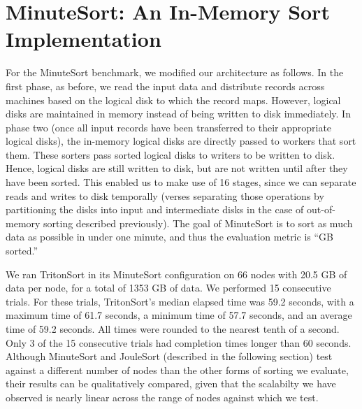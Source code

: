 \section{MinuteSort: An In-Memory Sort Implementation}
\label{sec:minutesort}

For the MinuteSort benchmark, we modified our architecture as follows. In the
first phase, as before, we read the input data and distribute records across
machines based on the logical disk to which the record maps. However, logical
disks are maintained in memory instead of being written to disk immediately.
In phase two (once all input records have been transferred to their appropriate
logical disks), the in-memory logical disks are directly passed to workers that
sort them. These sorters pass sorted logical disks to writers to be written to
disk. Hence, logical disks are still written to disk, but are not written until
after they have been sorted. This enabled us to make use of 16 \writer stages,
since we can separate reads and writes to disk temporally (verses separating
those operations by partitioning the disks into input and intermediate disks in
the case of out-of-memory sorting described previously).  The goal of
MinuteSort is to sort as much data as possible in under one minute, and thus
the evaluation metric is ``GB sorted.''

We ran TritonSort in its MinuteSort configuration on 66 nodes with 20.5 GB of
data per node, for a total of 1353 GB of data. We performed 15 consecutive
trials.  For these trials, TritonSort's median elapsed time was 59.2 seconds,
with a maximum time of 61.7 seconds, a minimum time of 57.7 seconds, and an
average time of 59.2 seconds. All times were rounded to the nearest tenth of a
second.  Only 3 of the 15 consecutive trials had completion times longer than
60 seconds.  Although MinuteSort and JouleSort (described in the following
section) test against a different number of nodes than the other forms of
sorting we evaluate, their results can be qualitatively compared, given that
the scalabilty we have observed is nearly linear across the range of nodes
against which we test.
